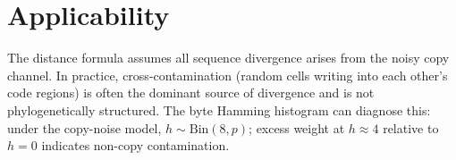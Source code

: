 \documentclass[11pt]{article}
\begin{document}
\section{Applicability}

The distance formula assumes all sequence divergence arises from the
noisy copy channel. In practice, cross-contamination (random cells
writing into each other's code regions) is often the dominant source
of divergence and is not phylogenetically structured. The byte Hamming
histogram can diagnose this: under the copy-noise model, $h \sim
\mathrm{Bin}(8,p)$; excess weight at $h \approx 4$ relative to
$h = 0$ indicates non-copy contamination.
\end{document}
